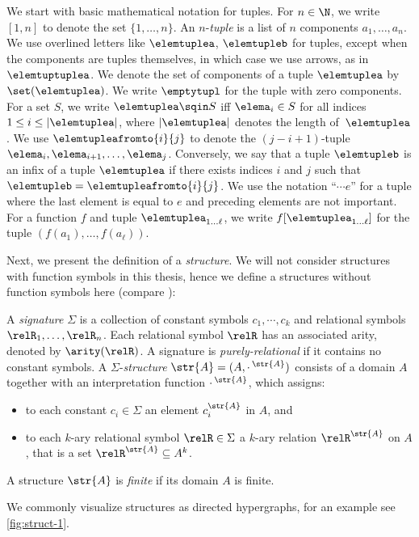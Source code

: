 We start with basic mathematical notation for tuples.
For $n \in \N$, we write $[1,n]$ to denote the set $\{1, \ldots, n \}$.
An $n$-\emph{tuple} is a list of $n$ components $a_{1}, \ldots{}, a_{n}$.
We use overlined letters like $\elemtuplea$, $\elemtupleb$ for tuples, except when the components are tuples themselves, in which case we use arrows, as in $\elemtuptuplea$.
We denote the set of components of a tuple $\elemtuplea$ by $\set(\elemtuplea)$.
We write $\emptytupl$ for the tuple with zero components.
For a set $S$, we write $\elemtuplea \sqin S$ iff $\elema_i \in S$ for all indices $1 \leq i \leq |\elemtuplea|$, where $|\elemtuplea|$ denotes the length of~$\elemtuplea$.
We use $\elemtupleafromto{i}{j}$ to denote the $(j{-}i{+}1)$-tuple $\elema_i, \elema_{i+1}, \ldots, \elema_j$.
Conversely, we say that a tuple $\elemtupleb$ is an infix of a tuple $\elemtuplea$ if there exists indices $i$ and $j$ such that $\elemtupleb = \elemtupleafromto{i}{j}$.
We use the notation ``$\cdots e$'' for a tuple where the last element is equal to $e$ and preceding elements are not important.
For a function $f$ and tuple $\elemtuplea_{1\ldots\ell}$, we write $f[\elemtuplea_{1\ldots\ell}]$ for the tuple $(f(a_{1}), \ldots, f(a_{\ell}))$.

Next, we present the definition of a \emph{structure}.
We will not consider structures with function symbols in this thesis, hence we define a structures without function symbols here (compare \cite[Definition 2.1]{Libkin04}):
\begin{definition}[Structures]
  A \emph{signature} $\Sigma$ is a collection of constant symbols $c_{1}, \cdots, c_{k}$ and relational symbols $\relR_{1}, \ldots, \relR_{n}$.
  Each relational symbol $\relR$ has an associated arity, denoted by $\arity(\relR)$.
  A signature is \emph{purely-relational} if it contains no constant symbols.
  A $\Sigma$-\emph{structure} $\str{A} = (A, {\cdot\,}^{\str{A}})$ consists of a domain $A$ together with an interpretation function ${\cdot\,}^{\str{A}}$, which assigns:
  \begin{itemize}
    \item to each constant $c_{i} \in \Sigma$ an element $c_{i}^{\str{A}}$ in $A$, and
    \item to each $k$-ary relational symbol $\relR \in \Sigma$ a $k$-ary relation $\relR^{\str{A}}$ on $A$, that is a set $\relR^{\str{A}} \subseteq A^{k}$.
  \end{itemize}
  A structure $\str{A}$ is \emph{finite} if its domain $A$ is finite.
\end{definition}
We commonly visualize structures as directed hypergraphs, for an example see \cref{fig:struct-1}.


